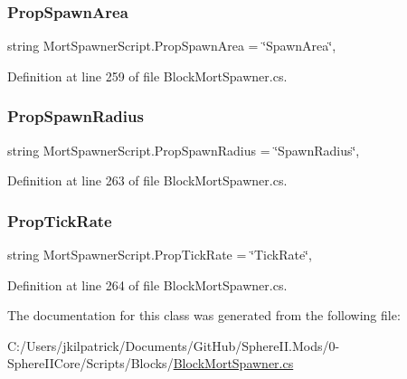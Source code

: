 \subsubsection{\texorpdfstring{PropSpawnArea}{PropSpawnArea}}
{\footnotesize\ttfamily string Mort\+Spawner\+Script.\+Prop\+Spawn\+Area = \char`\"{}Spawn\+Area\char`\"{}\hspace{0.3cm}{\ttfamily [static]}, {\ttfamily [protected]}}



Definition at line 259 of file Block\+Mort\+Spawner.\+cs.

\mbox{\label{class_mort_spawner_script_a4013939fa84e48e9e3ba7b266f2b29bc}} 
\subsubsection{\texorpdfstring{PropSpawnRadius}{PropSpawnRadius}}
{\footnotesize\ttfamily string Mort\+Spawner\+Script.\+Prop\+Spawn\+Radius = \char`\"{}Spawn\+Radius\char`\"{}\hspace{0.3cm}{\ttfamily [static]}, {\ttfamily [protected]}}



Definition at line 263 of file Block\+Mort\+Spawner.\+cs.

\mbox{\label{class_mort_spawner_script_adec0d47303c051fe4402e2446fa5b03f}} 
\subsubsection{\texorpdfstring{PropTickRate}{PropTickRate}}
{\footnotesize\ttfamily string Mort\+Spawner\+Script.\+Prop\+Tick\+Rate = \char`\"{}Tick\+Rate\char`\"{}\hspace{0.3cm}{\ttfamily [static]}, {\ttfamily [protected]}}



Definition at line 264 of file Block\+Mort\+Spawner.\+cs.



The documentation for this class was generated from the following file\+:\begin{DoxyCompactItemize}
\item 
C\+:/\+Users/jkilpatrick/\+Documents/\+Git\+Hub/\+Sphere\+I\+I.\+Mods/0-\/\+Sphere\+I\+I\+Core/\+Scripts/\+Blocks/\mbox{\hyperlink{_block_mort_spawner_8cs}{Block\+Mort\+Spawner.\+cs}}\end{DoxyCompactItemize}
